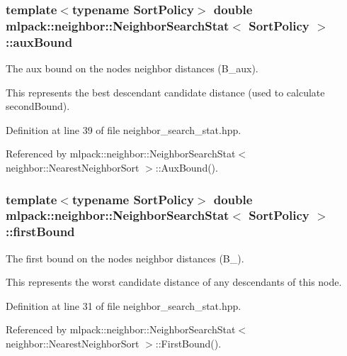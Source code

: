 \subsubsection[{aux\+Bound}]{\setlength{\rightskip}{0pt plus 5cm}template$<$typename Sort\+Policy$>$ double {\bf mlpack\+::neighbor\+::\+Neighbor\+Search\+Stat}$<$ Sort\+Policy $>$\+::aux\+Bound\hspace{0.3cm}{\ttfamily [private]}}\label{classmlpack_1_1neighbor_1_1NeighborSearchStat_a3ee0117fca9864d170ee426771064538}


The aux bound on the node\textquotesingle{}s neighbor distances (B\+\_\+aux). 

This represents the best descendant candidate distance (used to calculate second\+Bound). 

Definition at line 39 of file neighbor\+\_\+search\+\_\+stat.\+hpp.



Referenced by mlpack\+::neighbor\+::\+Neighbor\+Search\+Stat$<$ neighbor\+::\+Nearest\+Neighbor\+Sort $>$\+::\+Aux\+Bound().

\subsubsection[{first\+Bound}]{\setlength{\rightskip}{0pt plus 5cm}template$<$typename Sort\+Policy$>$ double {\bf mlpack\+::neighbor\+::\+Neighbor\+Search\+Stat}$<$ Sort\+Policy $>$\+::first\+Bound\hspace{0.3cm}{\ttfamily [private]}}\label{classmlpack_1_1neighbor_1_1NeighborSearchStat_ab555ed384690f47d9cbef7697c27b05c}


The first bound on the node\textquotesingle{}s neighbor distances (B\+\_). 

This represents the worst candidate distance of any descendants of this node. 

Definition at line 31 of file neighbor\+\_\+search\+\_\+stat.\+hpp.



Referenced by mlpack\+::neighbor\+::\+Neighbor\+Search\+Stat$<$ neighbor\+::\+Nearest\+Neighbor\+Sort $>$\+::\+First\+Bound().

